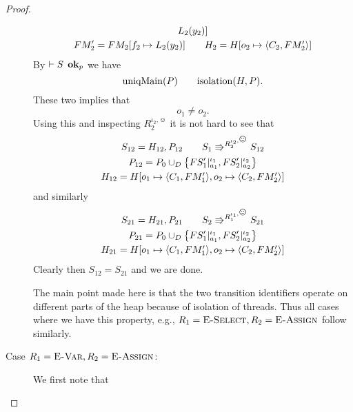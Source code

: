 \begin{proof}
\begin{description}
\begin{equation}
\begin{gathered}
          L_2(y_2)] \\
          FM'_2 = FM_2[f_2 \mapsto L_2(y_2)] \quad\quad H_2 = H[o_2 \mapsto
          \mbox{$\langle C_2, FM'_2 \rangle$}]
          \\
        \end{gathered}
      \end{equation}
      By $\vdash S \:\: \mbox{{\bf ok}$_p$}$ we have
      \begin{equation}
        \mbox{$\mathrm{uniqMain}$}(P) \quad\quad \mbox{$\mathrm{isolation}$}(H, P).
      \end{equation}
      These two implies that
      \begin{equation}
        o_1 \neq o_2.
      \end{equation}
      Using this and inspecting $R_2^{\iota_2, \smiley}$ it is not hard to see
      that 
      \begin{equation}
        \begin{gathered}
          S_{12} = H_{12}, P_{12} \andalso S_1 \Rrightarrow^{R_2^{\iota_2,
          \smiley}} S_{12}
          \\
          P_{12} = P_0 \cup_D \left\{ FS'_1|_{a_1}^{\iota_1},
          FS'_2|_{a_2}^{\iota_2} \right\} \\
          H_{12} = H[o_1 \mapsto \Obj{C_1, FM'_1}, o_2 \mapsto \Obj{C_2, FM'_2}]
        \end{gathered}
      \end{equation}
      and similarly 
      \begin{equation}
        \begin{gathered}
          S_{21} = H_{21}, P_{21} \andalso S_2 \Rrightarrow^{R_1^{\iota_1,
          \smiley}} S_{21}
          \\
          P_{21} = P_0 \cup_D \left\{ FS'_1|_{a_1}^{\iota_1},
          FS'_2|_{a_2}^{\iota_2} \right\} \\
          H_{21} = H[o_1 \mapsto \Obj{C_1, FM'_1}, o_2 \mapsto \Obj{C_2, FM'_2}]
        \end{gathered}
      \end{equation}
      Clearly then $S_{12} = S_{21}$ and we are done.
      \begin{remark}
        The main point made here is that the two transition identifiers operate
        on different parts of the heap because of isolation of threads. Thus all
        cases where we have this property, e.g., $R_1 = \mbox{{\sc E-Select}}, R_2 =
        \mbox{{\sc E-Assign}}$ follow similarly.
      \end{remark}
    \item[Case $R_1 = \mbox{{\sc E-Var}}, R_2 = \mbox{{\sc E-Assign}}$:] We first note that

\end{description}
\end{proof}
